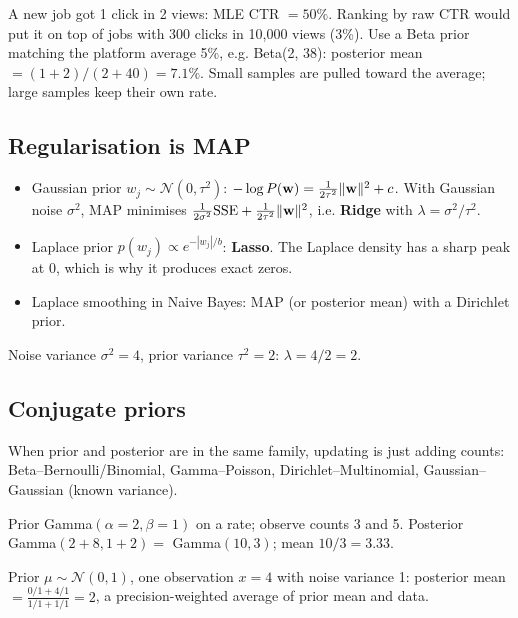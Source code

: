 \begin{example}
A new job got 1 click in 2 views: MLE CTR $= 50\%$. Ranking by raw CTR would put it on top of jobs with 300 clicks in 10{,}000 views
(3\%). Use a Beta prior matching the platform average 5\%, e.g. Beta(2, 38): posterior mean $= (1 + 2)/(2 + 40) = 7.1\%$. Small
samples are pulled toward the average; large samples keep their own rate.
\end{example}

\subsection{Regularisation is MAP}
\begin{itemize}
\item Gaussian prior $w_j\sim\mathcal N(0,\tau^2)$: $-\log P(\mathbf w) = \frac{1}{2\tau^2}\lVert \mathbf w\rVert^2 + c$. With Gaussian noise
  $\sigma^2$, MAP minimises $\frac{1}{2\sigma^2}\text{SSE} + \frac{1}{2\tau^2}\lVert \mathbf w\rVert^2$, i.e. \textbf{Ridge} with
  $\lambda = \sigma^2/\tau^2$.
\item Laplace prior $p(w_j)\propto e^{-|w_j|/b}$: \textbf{Lasso}. The Laplace density has a sharp peak at 0, which is why it produces exact
  zeros.
\item Laplace smoothing in Naive Bayes: MAP (or posterior mean) with a Dirichlet prior.
\end{itemize}
\begin{example}
Noise variance $\sigma^2 = 4$, prior variance $\tau^2 = 2$: $\lambda = 4/2 = 2$.
\end{example}

\subsection{Conjugate priors}
When prior and posterior are in the same family, updating is just adding counts:
Beta--Bernoulli/Binomial, Gamma--Poisson, Dirichlet--Multinomial, Gaussian--Gaussian (known variance).
\begin{example}
Prior Gamma$(\alpha = 2, \beta = 1)$ on a rate; observe counts 3 and 5. Posterior Gamma$(2 + 8, 1 + 2) = $ Gamma$(10, 3)$; mean $10/3 = 3.33$.
\end{example}
\begin{example}
Prior $\mu\sim\mathcal N(0, 1)$, one observation $x = 4$ with noise variance 1: posterior mean $= \frac{0/1 + 4/1}{1/1 + 1/1} = 2$, a
precision-weighted average of prior mean and data.
\end{example}

